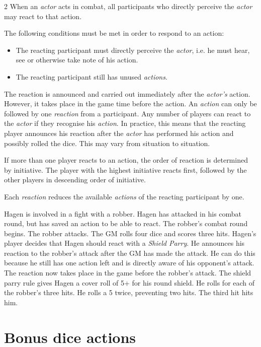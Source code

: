 \begin{multicols}{2}
When an \textit{actor} acts in combat, all participants who directly perceive the \textit{actor} may react to that action.

The following conditions must be met in order to respond to an action:
\begin{itemize}
    \item The reacting participant must directly perceive the \textit{actor}, i.e. he must hear, see or otherwise take note of his action.
    \item The reacting participant still has unused \textit{actions}.
\end{itemize}

The reaction is announced and carried out immediately after the \textit{actor's} action. However, it takes place in the game time before the action. An \textit{action} can only be followed by one \textit{reaction} from a participant. Any number of players can react to the \textit{actor} if they recognise his \textit{action}. In practice, this means that the reacting player announces his reaction after the \textit{actor} has performed his action and possibly rolled the dice. This may vary from situation to situation.

If more than one player reacts to an action, the order of reaction is determined by initiative. The player with the highest initiative reacts first, followed by the other players in descending order of initiative.

Each \textit{reaction} reduces the available \textit{actions} of the reacting participant by one.

\begin{pexample}[Example]
Hagen is involved in a fight with a robber. Hagen has attacked in his combat round, but has saved an action to be able to react.
The robber's combat round begins. The robber attacks. The GM rolls four dice and scores three hits.
Hagen's player decides that Hagen should react with a \textit{Shield Parry}. He announces his reaction to the robber's attack after the GM has made the attack. He can do this because he still has one action left and is directly aware of his opponent's attack.
The reaction now takes place in the game before the robber's attack. The shield parry rule gives Hagen a cover roll of 5+ for his round shield. He rolls for each of the robber's three hits. He rolls a 5 twice, preventing two hits. The third hit hits him.
\end{pexample}

\section{Bonus dice actions}


\end{multicols}

